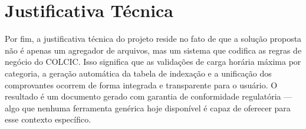\section{Justificativa Técnica}

Por fim, a justificativa técnica do projeto reside no fato de que a solução proposta não é apenas um agregador de arquivos, mas um sistema que codifica as regras de negócio do COLCIC. Isso significa que as validações de carga horária máxima por categoria, a geração automática da tabela de indexação e a unificação dos comprovantes ocorrem de forma integrada e transparente para o usuário. O resultado é um documento gerado com garantia de conformidade regulatória — algo que nenhuma ferramenta genérica hoje disponível é capaz de oferecer para esse contexto específico.
